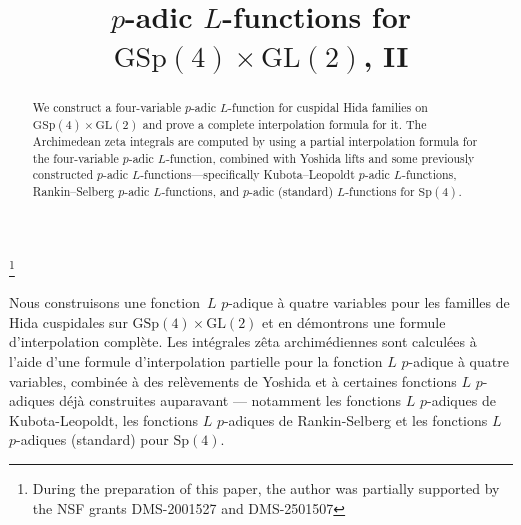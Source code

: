 \documentclass[JEP,XML,SOM,Unicode,published]{cedram}
\theoremstyle{plain}
\theoremstyle{remark}
\begin{document}
\frontmatter
\title{$p$-adic $L$-functions for $\mathrm{GSp}(4)\times\mathrm{GL}(2)$, II}

\author[\initial{Z.} \lastname{Liu}]{ }
\address{Department of Mathematics, University of California, Santa Barbara,\\
Santa Barbara, CA 93106-3080, USA}

\thanks{During the preparation of this paper, the author was partially supported by the NSF grants DMS-2001527 and DMS-2501507}

\begin{abstract}
We construct a four-variable $p$-adic $L$-function for cuspidal Hida families on $\mathrm{GSp}(4)\times\mathrm{GL}(2)$ and prove a complete interpolation formula for it. The Archimedean zeta integrals are computed by using a partial interpolation formula for the four-variable $p$-adic $L$-function, combined with Yoshida lifts and some previously constructed $p$-adic $L$-functions---specifically Kubota--Leopoldt $p$-adic $L$-functions, Rankin--Selberg $p$-adic $L$-functions, and $p$-adic (standard) $L$-functions for $\mathrm{Sp}(4)$.
\end{abstract}





\begin{altabstract}
Nous construisons une fonction~$L$ $p$-adique à quatre variables pour les familles de Hida cuspidales sur $\mathrm{GSp}(4)\times\mathrm{GL}(2)$ et en démontrons une formule d'interpolation complète. Les intégrales zêta archimédiennes sont calculées à l'aide d'une formule d'interpolation partielle pour la fonction $L$ $p$-adique à quatre varia\-bles, combinée à des relèvements de Yoshida et à certaines fonctions $L$ $p$-adiques déjà construites auparavant --- notamment les fonctions $L$ $p$-adiques de Kubota-Leopoldt, les fonctions $L$ $p$\nobreakdash-adiques de Rankin-Selberg et les fonctions $L$ $p$-adiques (standard) pour $\mathrm{Sp}(4)$.
\end{altabstract}
\end{document}
